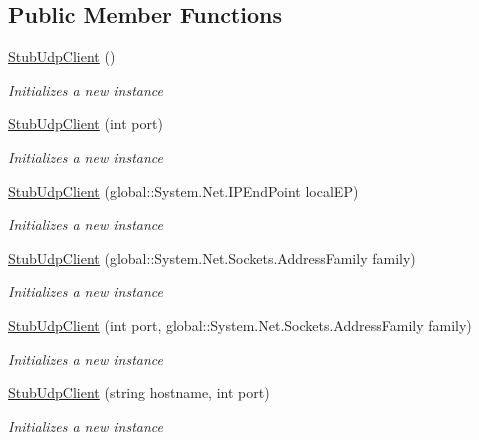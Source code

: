 \subsection*{Public Member Functions}
\begin{DoxyCompactItemize}
\item 
\hyperlink{class_system_1_1_net_1_1_sockets_1_1_fakes_1_1_stub_udp_client_afcd62da3acdc8d12dd175b55173accb6}{Stub\-Udp\-Client} ()
\begin{DoxyCompactList}\small\item\em Initializes a new instance\end{DoxyCompactList}\item 
\hyperlink{class_system_1_1_net_1_1_sockets_1_1_fakes_1_1_stub_udp_client_a36f5c1af007227c3b0c29c555de27155}{Stub\-Udp\-Client} (int port)
\begin{DoxyCompactList}\small\item\em Initializes a new instance\end{DoxyCompactList}\item 
\hyperlink{class_system_1_1_net_1_1_sockets_1_1_fakes_1_1_stub_udp_client_a502c86231ee0d1dd68ea3bf6bd99b321}{Stub\-Udp\-Client} (global\-::\-System.\-Net.\-I\-P\-End\-Point local\-E\-P)
\begin{DoxyCompactList}\small\item\em Initializes a new instance\end{DoxyCompactList}\item 
\hyperlink{class_system_1_1_net_1_1_sockets_1_1_fakes_1_1_stub_udp_client_a64f62699a3f462ba17c3b41dff9f1576}{Stub\-Udp\-Client} (global\-::\-System.\-Net.\-Sockets.\-Address\-Family family)
\begin{DoxyCompactList}\small\item\em Initializes a new instance\end{DoxyCompactList}\item 
\hyperlink{class_system_1_1_net_1_1_sockets_1_1_fakes_1_1_stub_udp_client_a215d89478084cfd698da28bc08fed6ff}{Stub\-Udp\-Client} (int port, global\-::\-System.\-Net.\-Sockets.\-Address\-Family family)
\begin{DoxyCompactList}\small\item\em Initializes a new instance\end{DoxyCompactList}\item 
\hyperlink{class_system_1_1_net_1_1_sockets_1_1_fakes_1_1_stub_udp_client_a985ab492176e195079b884103fec85f6}{Stub\-Udp\-Client} (string hostname, int port)
\begin{DoxyCompactList}\small\item\em Initializes a new instance\end{DoxyCompactList}\end{DoxyCompactItemize}
